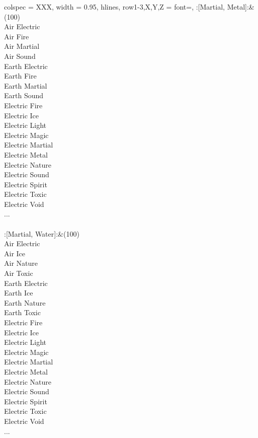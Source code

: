 \begin{longtblr}[
	caption = {2v2 Defending Weak},
	label = {2v2-Defending-Weak},
]{
	colspec = {XXX}, width = 0.95\linewidth,
	hlines,
	row{1-3,X,Y,Z} = {font=\bfseries},
}
	:[Martial, Metal]:&{(100)\\
	Air Electric \\
	Air Fire \\
	Air Martial \\
	Air Sound \\
	Earth Electric \\
	Earth Fire \\
	Earth Martial \\
	Earth Sound \\
	Electric Fire \\
	Electric Ice \\
	Electric Light \\
	Electric Magic \\
	Electric Martial \\
	Electric Metal \\
	Electric Nature \\
	Electric Sound \\
	Electric Spirit \\
	Electric Toxic \\
	Electric Void \\
	...\\
	}\\

	:[Martial, Water]:&{(100)\\
	Air Electric \\
	Air Ice \\
	Air Nature \\
	Air Toxic \\
	Earth Electric \\
	Earth Ice \\
	Earth Nature \\
	Earth Toxic \\
	Electric Fire \\
	Electric Ice \\
	Electric Light \\
	Electric Magic \\
	Electric Martial \\
	Electric Metal \\
	Electric Nature \\
	Electric Sound \\
	Electric Spirit \\
	Electric Toxic \\
	Electric Void \\
	...\\
	}\\


\end{longtblr}
